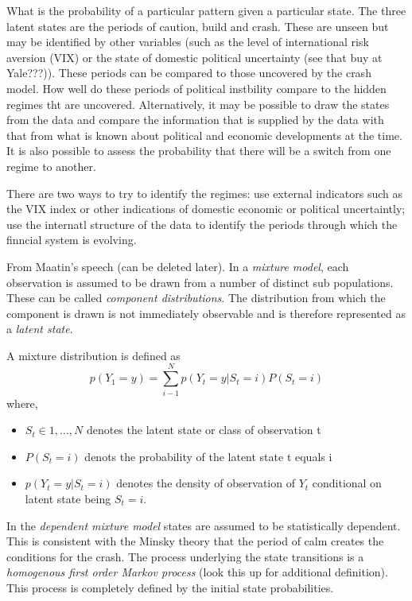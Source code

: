 \documentclass[12pt, a4paper, oneside]{article} %
\begin{document}
What is the probability of a particular pattern given a particular state. The three latent states are the periods of caution, build and crash.  These are unseen but may be identified by other variables (such as the level of international risk aversion (VIX) or the state of domestic political uncertainty (see that buy at Yale???)).  These periods can be compared to those uncovered by the crash model.  How well do these periods of political instbility compare to the hidden regimes tht are uncovered.  Alternatively, it may be possible to draw the states from the data and compare the information that is supplied by the data with that from what is known about political and economic developments at the time.  It is also possible to assess the probability that there will be a switch from one regime to another. 

There are two ways to try to identify the regimes: use external indicators such as the VIX index or other indications of domestic economic or political uncertaintly; use the internatl structure of the data to identify the periods through which the finncial system  is evolving. 

From Maatin's speech (can be deleted later).  In a \emph{mixture model}, each observation is assumed to be drawn from a number of distinct sub populations.  These can be called \emph{component distributions}.  The distribution from which the component is drawn is not immediately observable and is therefore represented as a \emph{latent state}. 

A mixture distribution is defined as 
\begin{equation}
p(Y_1 = y) = \sum_{i - 1}^N p(Y_t = y|S_t = i)P(S_t = i)
\end{equation}
where,
\begin{itemize}
\item $S_t \in {1, \dots, N}$ denotes the latent state or class of observation t
\item $P(S_t = i)$ denots the probability of the latent state t equals i 
\item $p(Y_t = y|S_t = i)$ denotes the density of observation of $Y_t$ conditional on latent state being $S_t = i$.
\end{itemize}

In the \emph{dependent mixture model} states are assumed to be statistically dependent.  This is consistent with the Minsky theory that the period of calm creates the conditions for the crash. The process underlying the state transitions is a \emph{homogenous first order Markov process}  (look this up for additional definition).  This process is completely defined by the initial state probabilities.  
\end{document}
